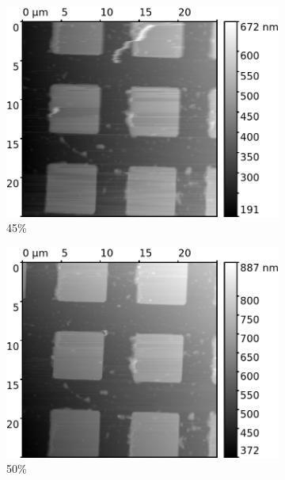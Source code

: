 \documentclass[11pt,a4paper]{article}
\begin{document}
\begin{appendices}
\begin{figure}[H]
\centering
\begin{subfigure}[b]{0.48\textwidth}
\includegraphics[width=\textwidth]{tapping_mode_Igain_500}
\caption{45\%}
\end{subfigure}
\begin{subfigure}[b]{0.48\textwidth}
\includegraphics[width=\textwidth]{tapping_mode_Igain_1500}
\caption{50\%}
\end{subfigure}\\\vspace{.2cm}
\begin{subfigure}[b]{0.48\textwidth}

\end{subfigure}
\end{figure}
\end{appendices}
\end{document}
